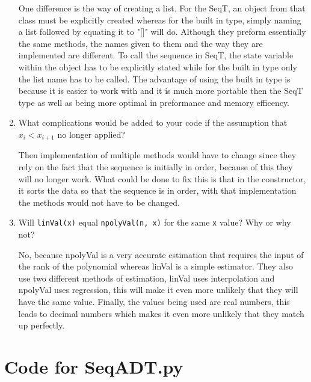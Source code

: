 \documentclass[12pt]{article}
\begin{document}
\begin{enumerate}
One difference is the way of creating a list. For the SeqT, an object from that
class must be explicitly created whereas for the built in type, simply naming a 
list followed by equating it to "[]" will do. Although they preform essentially 
the same methods, the names given to them and the way they are implemented are 
different. To call the sequence in SeqT, the state variable within the object has
to be explicitly stated while for the built in type only the list name has to 
be called. The advantage of using the built in type is because it is easier to
work with and it is much more portable then the SeqT type as well as being more
optimal in preformance and memory efficency.

\item What complications would be added to your code if the assumption that
  $x_i < x_{i+1}$ no longer applied?

Then implementation of multiple methods would have to change since they rely on the
fact that the sequence is initially in order, because of this they will no longer
work. What could be done to fix this is that in the constructor, it sorts the data
so that the sequence is in order, with that implementation the methods would not
have to be changed.

\item Will \texttt{linVal(x)} equal \texttt{npolyVal(n, x)} for the same \texttt{x}
  value?  Why or why not?

No, because npolyVal is a very accurate estimation that requires the input of the rank
of the polynomial whereas linVal is a simple estimator. They also use two different 
methods of estimation, linVal uses interpolation and npolyVal uses regression, this will
make it even more unlikely that they will have the same value. Finally, the values being
used are real numbers, this leads to decimal numbers which makes it even more unlikely that
they match up perfectly.
\end{enumerate}

\newpage

\lstset{language=Python, basicstyle=\tiny, breaklines=true, showspaces=false,
  showstringspaces=false, breakatwhitespace=true}
\lstset{language=C,linewidth=.94\textwidth,xleftmargin=1.1cm}

\def\thesection{\Alph{section}} 

\section{Code for SeqADT.py}
\end{document}
